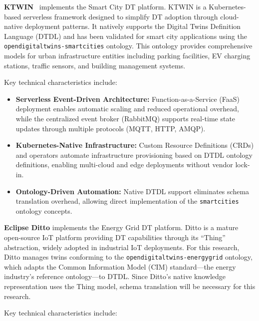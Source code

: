\textbf{KTWIN}~\cite{Wermann_Wickboldt_2025} implements the Smart City DT platform.
KTWIN is a Kubernetes-based serverless framework designed to 
    simplify DT adoption through cloud-native deployment patterns.
It natively supports the Digital Twins Definition Language (DTDL) and has been
    validated for smart city applications using the
    \texttt{opendigitaltwins-smartcities} ontology.
This ontology provides comprehensive models for
    urban infrastructure entities including
    parking facilities,
    EV charging stations,
    traffic sensors, and
    building management systems.

Key technical characteristics include:

\begin{itemize}
    \item \textbf{Serverless Event-Driven Architecture:}
    Function-as-a-Service (FaaS) deployment enables
        automatic scaling and
        reduced operational overhead, while
        the centralized event broker (RabbitMQ) supports
        real-time state updates through
        multiple protocols (MQTT, HTTP, AMQP).

    \item \textbf{Kubernetes-Native Infrastructure:}
    Custom Resource Definitions (CRDs) and operators automate
        infrastructure provisioning based on
        DTDL ontology definitions,
        enabling multi-cloud and edge deployments without vendor lock-in.
    
    \item \textbf{Ontology-Driven Automation:}
    Native DTDL support eliminates schema translation overhead,
        allowing direct implementation of the \texttt{smartcities} ontology concepts.
\end{itemize}

\textbf{Eclipse Ditto} implements the Energy Grid DT platform.
Ditto is a mature open-source IoT platform providing
    DT capabilities through its ``Thing'' abstraction,
    widely adopted in industrial IoT deployments.
For this research, Ditto manages twins conforming to the
    \texttt{opendigitaltwins-energygrid} ontology, which adapts the
    Common Information Model (CIM) standard---the energy industry's reference ontology---to DTDL.
Since Ditto's native knowledge representation uses the Thing model,
    schema translation will be necessary for this research.

Key technical characteristics include:

